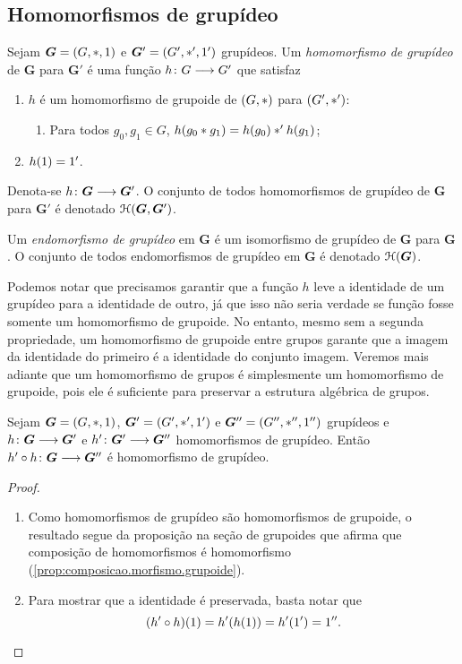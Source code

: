 \subsection{Homomorfismos de grupídeo}

\begin{definition}
Sejam $\bm G=(G,\ast,1)$ e $\bm G'=(G',\ast',1')$ grupídeos. Um \emph{homomorfismo de grupídeo} de $\bm G$ para $\bm G'$ é uma função ${h}\colon {G} \longrightarrow {G'}$ que satisfaz
	\begin{enumerate}
	\item $h$ é um homomorfismo de grupoide de $(G,\ast)$ para $(G',\ast')$:
		\begin{enumerate}
		\item Para todos $g_0,g_1 \in G$, $h(g_0 \ast g_1) = h(g_0) \ast' h(g_1)$;
		\end{enumerate}
	\item $h(1)=1'$.
	\end{enumerate}
Denota-se ${h}\colon {\bm G} \longrightarrow {\bm G'}$.
O conjunto de todos homomorfismos de grupídeo de $\bm G$ para $\bm G'$ é denotado $\mathcal{H}(\bm G,\bm G')$.

Um \emph{endomorfismo de grupídeo} em $\bm G$ é um isomorfismo de grupídeo de $\bm G$ para $\bm G$. O conjunto de todos endomorfismos de grupídeo em $\bm G$ é denotado $\mathcal{H}(\bm G)$.
\end{definition}

Podemos notar que precisamos garantir que a função $h$ leve a identidade de um grupídeo para a identidade de outro, já que isso não seria verdade se função fosse somente um homomorfismo de grupoide. No entanto, mesmo sem a segunda propriedade, um homomorfismo de grupoide entre grupos garante que a imagem da identidade do primeiro é a identidade do conjunto imagem. Veremos mais adiante que um homomorfismo de grupos é simplesmente um homomorfismo de grupoide, pois ele é suficiente para preservar a estrutura algébrica de grupos.

\begin{proposition}
\label{prop:composicao.morfismo.grupideo}
Sejam $\bm G=(G,\ast,1)$, $\bm G'=(G',\ast',1')$ e $\bm G''=(G'',\ast'',1'')$ grupídeos e ${h}\colon {\bm G} \longrightarrow {\bm G'}$ e ${h'}\colon {\bm G'} \longrightarrow {\bm G''}$ homomorfismos de grupídeo. Então ${h' \circ h}\colon {\bm G} \longrightarrow {\bm G''}$ é homomorfismo de grupídeo.
\end{proposition}
\begin{proof}
	\begin{enumerate}
	\item Como homomorfismos de grupídeo são homomorfismos de grupoide, o resultado segue da proposição na seção de grupoides que afirma que composição de homomorfismos é homomorfismo (\ref{prop:composicao.morfismo.grupoide}).
	\item Para mostrar que a identidade é preservada, basta notar que
		\begin{equation*}
		(h' \circ h)(1) = h'(h(1)) = h'(1') = 1''.
		\qedhere
		\end{equation*}
	\end{enumerate}
\end{proof}

